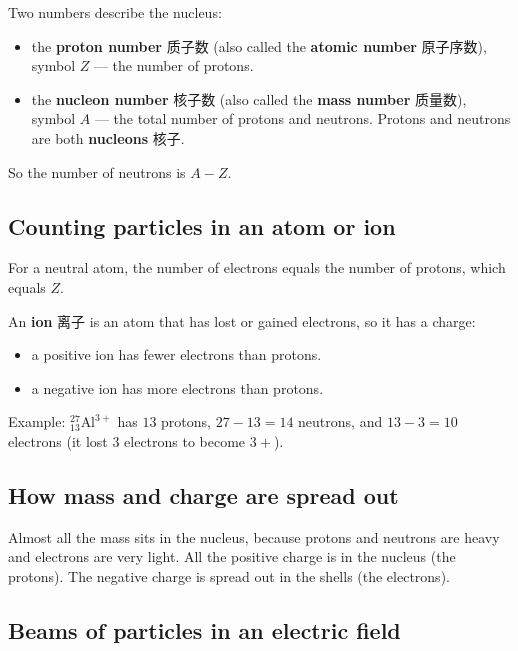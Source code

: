 \documentclass[11pt]{article}
\begin{document}
Two numbers describe the nucleus:

\begin{itemize}
\item the \textbf{proton number} 质子数 (also called the \textbf{atomic number} 原子序数), symbol $Z$ — the number of protons.

\item the \textbf{nucleon number} 核子数 (also called the \textbf{mass number} 质量数), symbol $A$ — the total number of protons and neutrons. Protons and neutrons are both \textbf{nucleons} 核子.

\end{itemize}

So the number of neutrons is $A - Z$.

\subsection*{Counting particles in an atom or ion}

For a neutral atom, the number of electrons equals the number of protons, which equals $Z$.

An \textbf{ion} 离子 is an atom that has lost or gained electrons, so it has a charge:

\begin{itemize}
\item a positive ion has fewer electrons than protons.

\item a negative ion has more electrons than protons.

\end{itemize}

Example: $^{27}_{13}\text{Al}^{3+}$ has $13$ protons, $27 - 13 = 14$ neutrons, and $13 - 3 = 10$ electrons (it lost 3 electrons to become $3+$).

\subsection*{How mass and charge are spread out}

Almost all the mass sits in the nucleus, because protons and neutrons are heavy and electrons are very light. All the positive charge is in the nucleus (the protons). The negative charge is spread out in the shells (the electrons).

\subsection*{Beams of particles in an electric field}
\end{document}

